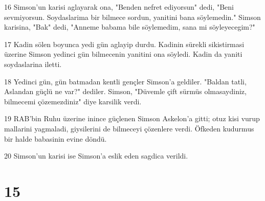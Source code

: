 \par 16 Simson'un karisi aglayarak ona, "Benden nefret ediyorsun" dedi, "Beni sevmiyorsun. Soydaslarima bir bilmece sordun, yanitini bana söylemedin." Simson karisina, "Bak" dedi, "Anneme babama bile söylemedim, sana mi söyleyecegim?"
\par 17 Kadin sölen boyunca yedi gün aglayip durdu. Kadinin sürekli sikistirmasi üzerine Simson yedinci gün bilmecenin yanitini ona söyledi. Kadin da yaniti soydaslarina iletti.
\par 18 Yedinci gün, gün batmadan kentli gençler Simson'a geldiler. "Baldan tatli, Aslandan güçlü ne var?" dediler. Simson, "Düvemle çift sürmüs olmasaydiniz, bilmecemi çözemezdiniz" diye karsilik verdi.
\par 19 RAB'bin Ruhu üzerine inince güçlenen Simson Askelon'a gitti; otuz kisi vurup mallarini yagmaladi, giysilerini de bilmeceyi çözenlere verdi. Öfkeden kudurmus bir halde babasinin evine döndü.
\par 20 Simson'un karisi ise Simson'a eslik eden sagdica verildi.

\chapter{15}

